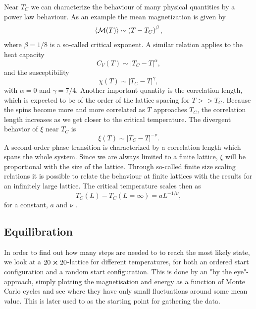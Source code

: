 \documentclass[11pt,a4paper,final]{article}
\numberwithin{equation}{section}
\begin{document}
Near $T_C$ we can characterize the behaviour of many physical quantities
by a power law behaviour.
As an example the mean magnetization is given by
\begin{equation}
  \langle {\cal M}(T) \rangle \sim \left(T-T_C\right)^{\beta},
\end{equation}
where $\beta=1/8$ is a so-called critical exponent. A similar relation
applies to the heat capacity 
\begin{equation}
  C_V(T) \sim \left|T_C-T\right|^{\alpha},
\end{equation}
and the susceptibility
\begin{equation}
  \chi(T) \sim \left|T_C-T\right|^{\gamma},
\end{equation}
with $\alpha = 0$ and $\gamma = 7/4$.
Another important quantity is the correlation length, which is expected
to be of the order of the lattice spacing for $T>> T_C$. Because the spins
become more and more correlated as $T$ approaches $T_C$, the correlation
length increases as we get closer to the critical temperature. The divergent
behavior of $\xi$ near $T_C$ 
is
\begin{equation}
  \xi(T) \sim \left|T_C-T\right|^{-\nu}.
  \label{eq:xi}
\end{equation}
A second-order phase transition is characterized by a
correlation length which spans the whole system.
Since we are always limited to a finite lattice, $\xi$ will
be proportional with the size of the lattice. 
Through so-called finite size scaling relations
it is possible to relate the behaviour at finite lattices with the 
results for an infinitely large lattice.
The critical temperature scales then as
\begin{equation}
 T_C(L)-T_C(L=\infty) = aL^{-1/\nu},
 \label{eq:tc}
\end{equation}
for a constant, $a$ and  $\nu$ \cite{MHJ}. 


\subsection{Equilibration}
In order to find out how many steps are needed to to reach the most likely
state, we look at a 
$20 \cross 20$-lattice for different temperatures,
for both an ordered start configuration
and a random start configuration. 
This is done by an "by the eye"-approach, simply plotting the 
magnetisation and energy as a function of Monte Carlo cycles and see 
where they have only small fluctuations around some mean value. This is 
later used to as the starting point for gathering the data.
\end{document}

